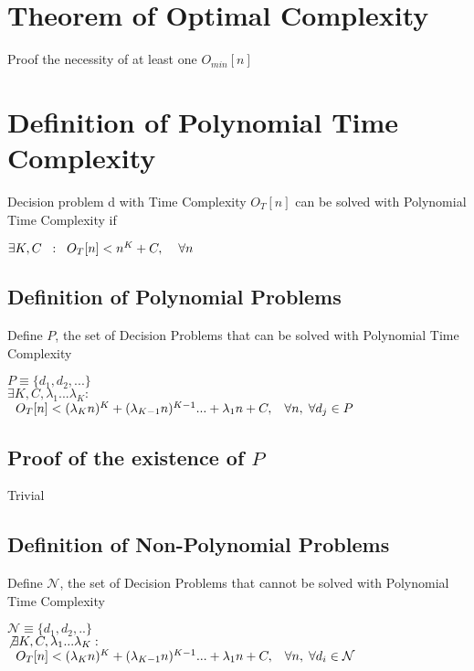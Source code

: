 \documentclass[11pt]{article}
\begin{document}
\section{Theorem of Optimal Complexity}
Proof the necessity of at least one $O_{min}[n]$








\section{Definition of Polynomial Time Complexity}
Decision problem d with Time Complexity $O_T[n]$ can be solved with Polynomial Time Complexity if
\begin{center}
$
\exists K,C \hspace{2mm} : \hspace{2mm} O_T[n] < n^K + C, \hspace{4mm} \forall n
$
\end{center}









\subsection{Definition of Polynomial Problems}
Define $P$, the set of Decision Problems that can be solved with Polynomial Time Complexity
\begin{center}
$
P \equiv \{d_1,d_2,...\}
$
\\
$
\exists K,C,\lambda_1...\lambda_K : 
$
\\
$
\hspace{2mm} O_T[n] < (\lambda_K n)^K + (\lambda_{K-1} n)^{K-1}... + \lambda_1 n + C, \hspace{3mm} \forall n, \hspace{1mm} \forall d_j \in P
$
\end{center}

\subsection{Proof of the existence of $P$}
Trivial

\subsection{Definition of Non-Polynomial Problems}
Define $\mathcal{N}$, the set of Decision Problems that cannot be solved with Polynomial Time Complexity
\begin{center}
$
\mathcal{N} \equiv \{ d_1,d_2,.. \} 
$
\\
$ 
\not \exists K,C,\lambda_1...\lambda_K : \hspace{2mm}
$
\\
$
\hspace{2mm} O_T[n] < (\lambda_K n)^K + (\lambda_{K-1} n)^{K-1}... + \lambda_1 n + C, \hspace{3mm} \forall n, \hspace{1mm} \forall d_i \in \mathcal{N}
$
\end{center}
\end{document}
